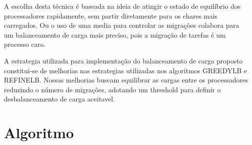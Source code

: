 A escolha desta técnica é baseada na ideia de atingir o estado de equilíbrio dos processadores rapidamente, sem partir diretamente para os chares mais carregados. Ou o uso de uma media para controlar as migrações colabora para um balanceamento de carga mais preciso, pois a migração de tarefas é um processo caro. 

A estrategia utilizada para implementação do balanceamento de carga proposto constitui-se de melhorias nas estrategias utilizadas nos algoritmos GREEDYLB e REFINELB. Nossas melhorias buscam equilibrar as cargas entre os processadores reduzindo o número de migrações, adotando um threshold para definir o desbalanceamento de carga aceitavel. 

\section{Algoritmo}

